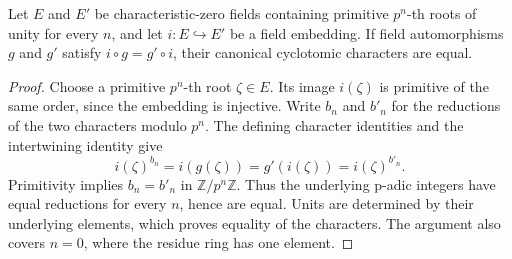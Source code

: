 \begin{lemma}
\label{ft:cyclotomic-character-naturality}
\leanok
Let $E$ and $E'$ be characteristic-zero fields containing primitive
$p^n$-th roots of unity for every $n$, and let $i:E\hookrightarrow E'$
be a field embedding. If field automorphisms $g$ and $g'$ satisfy
$i\circ g=g'\circ i$, their canonical cyclotomic characters are equal.
\end{lemma}
\begin{proof}
Choose a primitive $p^n$-th root $\zeta\in E$. Its image $i(\zeta)$
is primitive of the same order, since the embedding is injective.
Write $b_n$ and $b'_n$ for the reductions of the two characters
modulo $p^n$. The defining character identities and the intertwining
identity give
\[
 i(\zeta)^{b_n}=i(g(\zeta))=g'(i(\zeta))=i(\zeta)^{b'_n}.
\]
Primitivity implies $b_n=b'_n$ in $\mathbb Z/p^n\mathbb Z$.
Thus the underlying p-adic integers have equal reductions for every
$n$, hence are equal. Units are determined by their underlying
elements, which proves equality of the characters. The argument
also covers $n=0$, where the residue ring has one element.
\end{proof}

